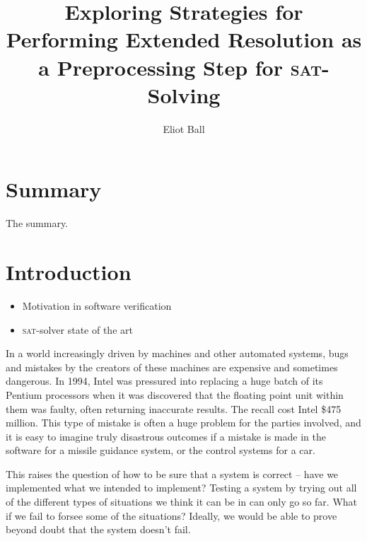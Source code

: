 \documentclass[11pt]{article}
\begin{document}
\title{Exploring Strategies for Performing Extended Resolution as a Preprocessing Step for \textsc{sat}-Solving}
\author{Eliot Ball}

\maketitle

\section*{Summary}

The summary.

\tableofcontents

\section{Introduction}

\begin{itemize}
  \item Motivation in software verification
  \item \textsc{sat}-solver state of the art
\end{itemize}

In a world increasingly driven by machines and other automated systems, bugs and mistakes by the creators of these machines are expensive and sometimes dangerous. In 1994, Intel was pressured into replacing a huge batch of its Pentium processors when it was discovered that the floating point unit within them was faulty, often returning inaccurate results. The recall cost Intel \$475 million. This type of mistake is often a huge problem for the parties involved, and it is easy to imagine truly disastrous outcomes if a mistake is made in the software for a missile guidance system, or the control systems for a car.

This raises the question of how to be sure that a system is correct -- have we implemented what we intended to implement? Testing a system by trying out all of the different types of situations we think it can be in can only go so far. What if we fail to forsee some of the situations? Ideally, we would be able to prove beyond doubt that the system doesn't fail.
\end{document}
